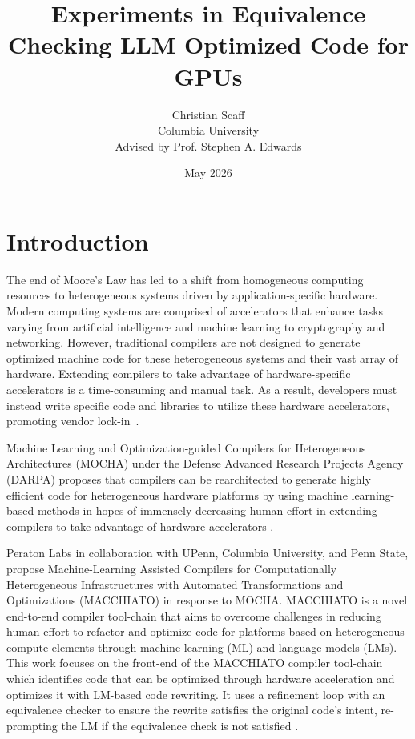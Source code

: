\documentclass{article}
\title{Experiments in Equivalence Checking LLM Optimized Code for GPUs}
\author{
Christian Scaff\\
Columbia University\\
{\small Advised by Prof. Stephen A. Edwards}
}
\date{May 2026}
\begin{document}
\maketitle

\tableofcontents

\section{Introduction}

The end of Moore's Law has led to a shift from homogeneous computing resources to heterogeneous systems driven by application-specific hardware. Modern computing systems are comprised of accelerators that enhance tasks varying from artificial intelligence and machine learning to cryptography and networking. However, traditional compilers are not designed to generate optimized machine code for these heterogeneous systems and their vast array of hardware. Extending compilers to take advantage of hardware-specific accelerators is a time-consuming and manual task. As a result, developers must instead write specific code and libraries to utilize these hardware accelerators, promoting vendor lock-in~\cite{darpa_mocha_2024}.

Machine Learning and Optimization-guided Compilers for Heterogeneous Architectures (MOCHA) under the Defense Advanced Research Projects Agency (DARPA) proposes that compilers can be rearchitected to generate highly efficient code for heterogeneous hardware platforms by using machine learning-based methods in hopes of immensely decreasing human effort in extending compilers to take advantage of hardware accelerators \cite{darpa_mocha_2024}.

Peraton Labs in collaboration with UPenn, Columbia University, and Penn State, propose Machine-Learning Assisted Compilers for Computationally Heterogeneous Infrastructures with Automated Transformations and Optimizations (MACCHIATO) in response to MOCHA. MACCHIATO is a novel end-to-end compiler tool-chain that aims to overcome challenges in reducing human effort to refactor and optimize code for platforms based on heterogeneous compute elements through machine learning (ML) and language models (LMs). This work focuses on the front-end of the MACCHIATO compiler tool-chain which identifies code that can be optimized through hardware acceleration and optimizes it with LM-based code rewriting. It uses a refinement loop with an equivalence checker to ensure the rewrite satisfies the original code's intent, re-prompting the LM if the equivalence check is not satisfied \cite{HR001124S0035}.
\end{document}

